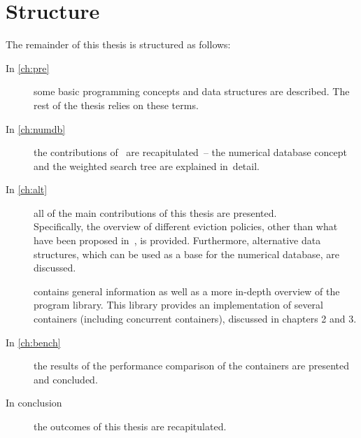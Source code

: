 \section{Structure}
The remainder of this thesis is structured as follows:
 \begin{description}
 \item[In \cref{ch:pre}] some basic programming concepts and data structures are described. The rest of the thesis relies on these terms.
 \item[In \cref{ch:numdb}] the contributions of~\cite{park90} are recapitulated~-- the numerical database concept and the weighted search tree are explained in~detail.
 \item[In \cref{ch:alt}] all of the main contributions of this thesis are presented. \\ Specifically, the overview of different eviction policies, other than what have been proposed in~\cite{park90}, is provided. Furthermore, alternative data structures, which can be used as a base for the numerical database, are discussed.

 \item [] contains general information as well as a more in-depth overview of the \numdbname{} program library. This library provides an implementation of several containers (including concurrent containers), discussed in chapters 2 and 3.

 \item [In \cref{ch:bench}] the results of the performance comparison of the containers are presented and concluded.

 \item [In conclusion] the outcomes of this thesis are recapitulated.

\end{description}
